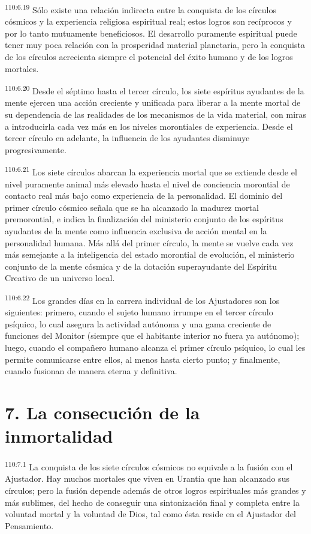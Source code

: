 \documentclass[twoside, 11pt]{book}
\begin{document}
\par
\textsuperscript{110:6.19} Sólo existe una relación indirecta entre la conquista de los círculos cósmicos y la experiencia religiosa espiritual real; estos logros son recíprocos y por lo tanto mutuamente beneficiosos. El desarrollo puramente espiritual puede tener muy poca relación con la prosperidad material planetaria, pero la conquista de los círculos acrecienta siempre el potencial del éxito humano y de los logros mortales.

\par
\textsuperscript{110:6.20} Desde el séptimo hasta el tercer círculo, los siete espíritus ayudantes de la mente ejercen una acción creciente y unificada para liberar a la mente mortal de su dependencia de las realidades de los mecanismos de la vida material, con miras a introducirla cada vez más en los niveles morontiales de experiencia. Desde el tercer círculo en adelante, la influencia de los ayudantes disminuye progresivamente.

\par
\textsuperscript{110:6.21} Los siete círculos abarcan la experiencia mortal que se extiende desde el nivel puramente animal más elevado hasta el nivel de conciencia morontial de contacto real más bajo como experiencia de la personalidad. El dominio del primer círculo cósmico señala que se ha alcanzado la madurez mortal premorontial, e indica la finalización del ministerio conjunto de los espíritus ayudantes de la mente como influencia exclusiva de acción mental en la personalidad humana. Más allá del primer círculo, la mente se vuelve cada vez más semejante a la inteligencia del estado morontial de evolución, el ministerio conjunto de la mente cósmica y de la dotación superayudante del Espíritu Creativo de un universo local.

\par
\textsuperscript{110:6.22} Los grandes días en la carrera individual de los Ajustadores son los siguientes: primero, cuando el sujeto humano irrumpe en el tercer círculo psíquico, lo cual asegura la actividad autónoma y una gama creciente de funciones del Monitor (siempre que el habitante interior no fuera ya autónomo); luego, cuando el compañero humano alcanza el primer círculo psíquico, lo cual les permite comunicarse entre ellos, al menos hasta cierto punto; y finalmente, cuando fusionan de manera eterna y definitiva.

\section*{7. La consecución de la inmortalidad}
\par
\textsuperscript{110:7.1} La conquista de los siete círculos cósmicos no equivale a la fusión con el Ajustador. Hay muchos mortales que viven en Urantia que han alcanzado sus círculos; pero la fusión depende además de otros logros espirituales más grandes y más sublimes, del hecho de conseguir una sintonización final y completa entre la voluntad mortal y la voluntad de Dios, tal como ésta reside en el Ajustador del Pensamiento.
\end{document}
